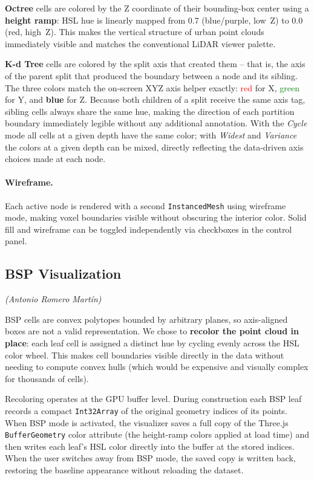 \documentclass[12pt,a4paper]{article}
\begin{document}
\textbf{Octree} cells are colored by the Z coordinate of their bounding-box
center using a \textbf{height ramp}: HSL hue is linearly mapped from 0.7
(blue/purple, low~Z) to 0.0 (red, high~Z). This makes the vertical structure
of urban point clouds immediately visible and matches the conventional LiDAR
viewer palette.

\textbf{K-d Tree} cells are colored by the split axis that created them --
that is, the axis of the parent split that produced the boundary between a
node and its sibling. The three colors match the on-screen XYZ axis helper
exactly: \textcolor{red}{red} for X, \textcolor{green}{green} for Y, and
\textbf{blue} for Z. Because both children of a split receive the same axis
tag, sibling cells always share the same hue, making the direction of each
partition boundary immediately legible without any additional annotation.
With the \textit{Cycle} mode all cells at a given depth have the same color;
with \textit{Widest} and \textit{Variance} the colors at a given depth can
be mixed, directly reflecting the data-driven axis choices made at each node.

\paragraph{Wireframe.}
Each active node is rendered with a second \texttt{InstancedMesh} using
wireframe mode, making voxel boundaries visible without obscuring the interior
color. Solid fill and wireframe can be toggled independently via checkboxes in
the control panel.

\subsection{BSP Visualization}
\textit{(Antonio Romero Mart\'in)}

BSP cells are convex polytopes bounded by arbitrary planes, so axis-aligned
boxes are not a valid representation. We chose to \textbf{recolor the point
cloud in place}: each leaf cell is assigned a distinct hue by cycling evenly
across the HSL color wheel. This makes cell boundaries visible directly in the
data without needing to compute convex hulls (which would be expensive and
visually complex for thousands of cells).

Recoloring operates at the GPU buffer level. During construction each BSP leaf
records a compact \texttt{Int32Array} of the original geometry indices of its
points. When BSP mode is activated, the visualizer saves a full copy of the
Three.js \texttt{BufferGeometry} color attribute (the height-ramp colors
applied at load time) and then writes each leaf's HSL color directly into
the buffer at the stored indices. When the user switches away from BSP mode,
the saved copy is written back, restoring the baseline appearance without
reloading the dataset.
\end{document}
